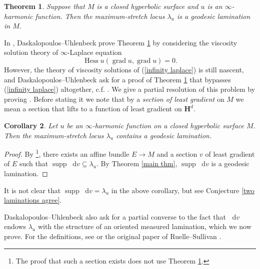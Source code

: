 \documentclass[reqno,12pt,letterpaper]{amsart}
\newcommand{\Hyp}{\mathbf H}
\DeclareMathOperator{\Hess}{Hess}
\DeclareMathOperator{\supp}{supp}
\newcommand*\dif{\mathop{}\!\mathrm{d}}
\DeclareMathOperator{\grad}{grad}
\newcommand{\dfn}[1]{\emph{#1}\index{#1}}
\newtheorem{theorem}{Theorem}[section]
\newtheorem{corollary}[theorem]{Corollary}
\theoremstyle{definition}
\numberwithin{equation}{section}
\begin{document}
\begin{theorem}\label{infinity harmonic laminations}
Suppose that $M$ is a closed hyperbolic surface and $u$ is an $\infty$-harmonic function. Then the maximum-stretch locus $\lambda_u$ is a geodesic lamination in $M$.
\end{theorem}

In \cite[\S5]{daskalopoulos2020transverse}, Daskalopoulos--Uhlenbeck prove Theorem \ref{infinity harmonic laminations} by considering the viscosity solution theory of $\infty$-Laplace equation
\begin{equation}\label{infinity laplace}
    \Hess u(\grad u, \grad u) = 0.
\end{equation}
However, the theory of viscosity solutions of (\ref{infinity laplace}) is still nascent, and Daskalopoulos--Uhlenbeck ask for a proof of Theorem \ref{infinity harmonic laminations} that bypasses (\ref{infinity laplace}) altogether, c.f. \cite[Problem 9.5]{daskalopoulos2020transverse}.
We give a partial resolution of this problem by proving \cite[Theorem-Conjecture 9.6]{daskalopoulos2020transverse}.
Before stating it we note that by a \dfn{section of least gradient} on $M$ we mean a section that lifts to a function of least gradient on $\Hyp^d$.

\begin{corollary}\label{maximum stretch contains lamination}
Let $u$ be an $\infty$-harmonic function on a closed hyperbolic surface $M$.
Then the maximum-stretch locus $\lambda_u$ contains a geodesic lamination.
\end{corollary}
\begin{proof}
By \cite[\S6]{daskalopoulos2020transverse}\footnote{The proof that such a section exists does not use Theorem \ref{infinity harmonic laminations}.}, there exists an affine bundle $E \to M$ and a section $v$ of least gradient of $E$ such that $\supp \dif v \subseteq \lambda_u$.
By Theorem \ref{main thm}, $\supp \dif v$ is a geodesic lamination.
\end{proof}

It is not clear that $\supp \dif v = \lambda_u$ in the above corollary, but see Conjecture \ref{two laminations agree}.

Daskalopoulos--Uhlenbeck also ask for \cite[Problem 9.7]{daskalopoulos2020transverse} a partial converse to the fact that $\dif v$ endows $\lambda_u$ with the structure of an oriented measured lamination, which we now prove.
For the definitions, see \cite[\S8]{daskalopoulos2020transverse} or the original paper of Ruelle--Sullivan \cite{Ruelle75}.
\end{document}
